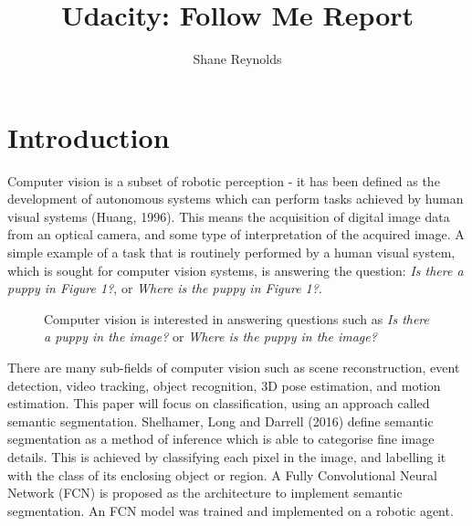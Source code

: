 \documentclass[a4paper]{article}
\begin{document}
\title{Udacity: Follow Me Report}
\author{Shane Reynolds}
\maketitle
\tableofcontents

\newpage

\section{Introduction}
Computer vision is a subset of robotic perception - it has been defined as the development of autonomous systems which can perform tasks achieved by human visual systems (Huang, 1996). This means the acquisition of digital image data from an optical camera, and some type of interpretation of the acquired image. A simple example of a task that is routinely performed by a human visual system, which is sought for computer vision systems, is answering the question: \textit{Is there a puppy in Figure 1?}, or \textit{Where is the puppy in Figure 1?}.
\begin{figure}[h]
\centering
{}
\caption{Computer vision is interested in answering questions such as \textit{Is there a puppy in the image?} or \textit{Where is the puppy in the image?}}
\end{figure}

There are many sub-fields of computer vision such as scene reconstruction, event detection, video tracking, object recognition, 3D pose estimation, and motion estimation. This paper will focus on classification, using an approach called semantic segmentation. Shelhamer, Long and Darrell (2016) define semantic segmentation as a method of inference which is able to categorise fine image details. This is achieved by classifying each pixel in the image, and labelling it with the class of its enclosing object or region. A Fully Convolutional Neural Network (FCN) is proposed as the architecture to implement semantic segmentation. An FCN model was trained and implemented on a robotic agent.
\end{document}
